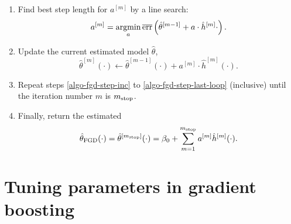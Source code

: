 \begin{algorithm}
\begin{enumerate}
    \item
        \label{algo-fgd-step-line}
        Find best step length for $a^{[m]}$ by a line search:
        \begin{equation*}
            a^{[m]}=\operatorname*{argmin}_{a}\overline{\text{err}}\left(\hat{\theta}^{[m-1]}+a\cdot\hat{h}^{[m]}{\cdot}\right).
        \end{equation*}
    \item
        \label{algo-fgd-step-last-loop}
        Update the current estimated model $\hat{\theta}$,
        \begin{equation*}
            \hat{\theta}^{[m]}(\cdot)\gets \hat{\theta}^{[m-1]}(\cdot)+a^{[m]}\cdot \hat{h}^{[m]}(\cdot).
        \end{equation*}
    \item
        Repeat steps \ref{algo-fgd-step-inc} to \ref{algo-fgd-step-last-loop} (inclusive) until the iteration number $m$ is $m_{\text{stop}}$.
    \item
        Finally, return the estimated
        \begin{equation*}
            \hat{\theta}_{\text{FGD}}(\cdot)=\hat{\theta}^{[m_{\text{stop}}]}(\cdot)=\beta_0+\sum_{m=1}^{m_{\text{stop}}}a^{[m]}\hat{h}^{[m]}(\cdot).
        \end{equation*}
\end{enumerate}
\end{algorithm}

\section{Tuning parameters in gradient boosting}

